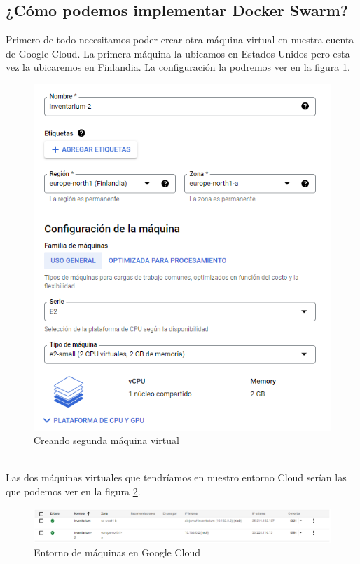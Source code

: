 \subsection{¿Cómo podemos implementar Docker Swarm?}
Primero de todo necesitamos poder crear otra máquina virtual en nuestra cuenta de Google Cloud. La primera máquina la ubicamos en Estados Unidos pero esta vez la ubicaremos en Finlandia. La configuración la podremos ver en la figura \ref{fig:creando-segunda-maquina}.
\begin{figure}
    \centering
    \includegraphics[scale=0.6, keepaspectratio]{imagenes/complemento/docker-swarm/creating_second_virtual_machine.png}
    \caption{Creando segunda máquina virtual}\label{fig:creando-segunda-maquina}
\end{figure}
\\Las dos máquinas virtuales que tendríamos en nuestro entorno Cloud serían las que podemos ver en la figura \ref{fig:entorno-maquinas-cloud}.
\begin{figure}
    \centering
    \includegraphics[scale=0.45, keepaspectratio]{imagenes/complemento/docker-swarm/virtual_machines_on_google_cloud.png}
    \caption{Entorno de máquinas en Google Cloud}\label{fig:entorno-maquinas-cloud}
\end{figure}

